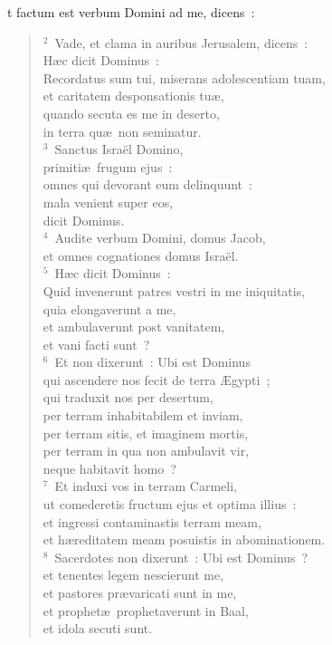 \bchapter
{}t factum est verbum Domini ad me, dicens~:
\begin{verse}${}^{2}$~Vade, et clama in auribus Jerusalem, dicens~:\\ H\ae c dicit Dominus~:\\ Recordatus sum tui, miserans adolescentiam tuam,\\ et caritatem desponsationis tu\ae ,\\ quando secuta es me in deserto,\\ in terra qu\ae\ non seminatur.\\
${}^{3}$~Sanctus Isra\"el Domino,\\ primiti\ae\ frugum ejus~:\\ omnes qui devorant eum delinquunt~:\\ mala venient super eos,\\ dicit Dominus.\\
${}^{4}$~Audite verbum Domini, domus Jacob,\\ et omnes cognationes domus Isra\"el.\\
${}^{5}$~H\ae c dicit Dominus~:\\ Quid invenerunt patres vestri in me iniquitatis,\\ quia elongaverunt a me,\\ et ambulaverunt post vanitatem,\\ et vani facti sunt~?\\
${}^{6}$~Et non dixerunt~: Ubi est Dominus\\ qui ascendere nos fecit de terra \AE gypti~;\\ qui traduxit nos per desertum,\\ per terram inhabitabilem et inviam,\\ per terram sitis, et imaginem mortis,\\ per terram in qua non ambulavit vir,\\ neque habitavit homo~?\\
${}^{7}$~Et induxi vos in terram Carmeli,\\ ut comederetis fructum ejus et optima illius~:\\ et ingressi contaminastis terram meam,\\ et h\ae reditatem meam posuistis in abominationem.\\
${}^{8}$~Sacerdotes non dixerunt~: Ubi est Dominus~?\\ et tenentes legem nescierunt me,\\ et pastores pr\ae varicati sunt in me,\\ et prophet\ae\ prophetaverunt in Baal,\\ et idola secuti sunt.\\

\end{verse}
